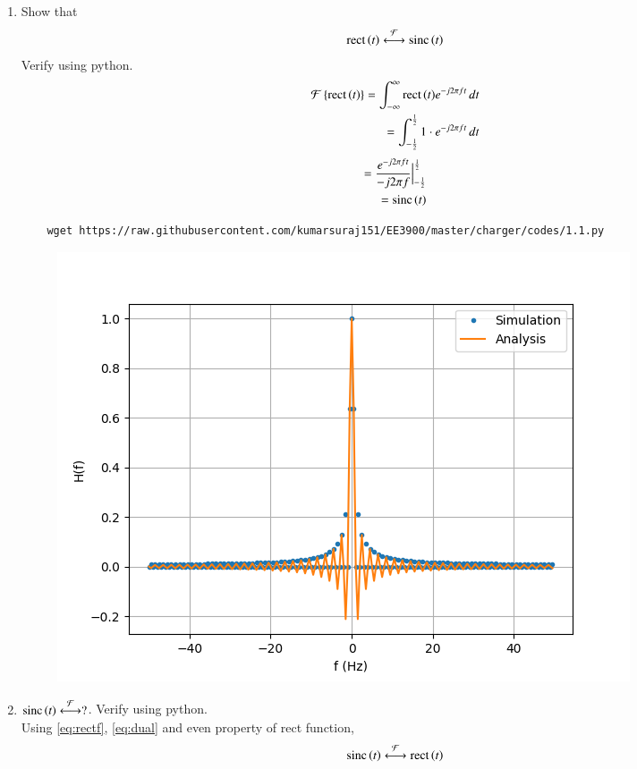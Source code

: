\documentclass[journal,12pt,twocolumn]{IEEEtran}
\renewcommand\thesection{\arabic{section}}
\begin{document}
\begin{enumerate}[label=\thesection.\arabic*
,ref=\thesection.\theenumi]
\begin{figure}[!ht]
    \caption{}
\end{figure}
 \item Show that 
 \begin{align}
	 \text{rect}\left(t\right) \overset{\mathcal{F}}{ \longleftrightarrow} \text{sinc}\left(t\right)
 \end{align}
 Verify using python.\\
 \solution
 \begin{align}
  \mathcal{F}\left\{\text{rect}\left(t\right)\right\}=\int_{-\infty}^{\infty}{\text{rect}\left(t\right)}e^{-j2\pi ft}\,dt\\
  =\int_{-\frac{1}{2}}^{\frac{1}{2}}1\cdot e^{-j2\pi ft}\,dt
\end{align}
\begin{align}
  =\frac{e^{-j2\pi ft}}{-j2\pi f}\Big |_{-\frac{1}{2}}^{\frac{1}{2}}\\
 \label{eq:rectf}
  =\text{sinc}\left(t\right)
  \end{align}
  \begin{lstlisting}
    wget https://raw.githubusercontent.com/kumarsuraj151/EE3900/master/charger/codes/1.1.py
  \end{lstlisting}
  \begin{figure}[!ht]
    \centering
    \includegraphics[width=\columnwidth]{./figs/3.9}
    \caption{}
\end{figure}
 \item 
$	 \text{sinc}\left(t\right)\overset{\mathcal{F}}{ \longleftrightarrow} ?$.  Verify using python.\\
\solution
Using \eqref{eq:rectf}, \eqref{eq:dual} and even property of rect function,
\begin{align}
\label{eq:sinc}
\text{sinc}\left(t\right)\overset{\mathcal{F}}{ \longleftrightarrow}\text{rect}\left(t\right)
\end{align}

\end{enumerate}
\end{document}
